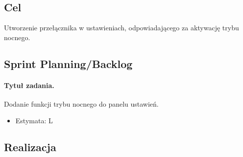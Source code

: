 \documentclass[a4paper]{article}
\begin{document}
\subsection{Cel} Utworzenie przełącznika w ustawieniach, odpowiadającego za aktywację trybu nocnego.

\subsection{Sprint Planning/Backlog}

\paragraph{Tytuł zadania.} Dodanie funkcji trybu nocnego do panelu ustawień.
\begin{itemize}
\item Estymata: L
\end{itemize}


\subsection{Realizacja}
\end{document}
